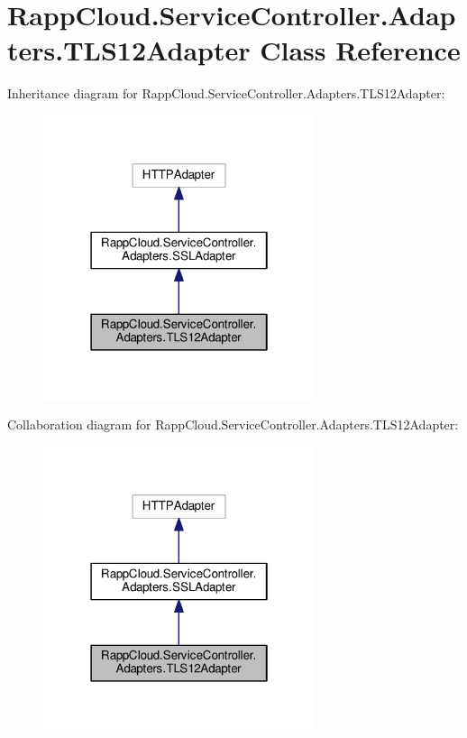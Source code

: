 \hypertarget{classRappCloud_1_1ServiceController_1_1Adapters_1_1TLS12Adapter}{\section{Rapp\-Cloud.\-Service\-Controller.\-Adapters.\-T\-L\-S12\-Adapter Class Reference}
\label{classRappCloud_1_1ServiceController_1_1Adapters_1_1TLS12Adapter}
}


Inheritance diagram for Rapp\-Cloud.\-Service\-Controller.\-Adapters.\-T\-L\-S12\-Adapter\-:
\nopagebreak
\begin{figure}[H]
\begin{center}
\leavevmode
\includegraphics[width=226pt]{classRappCloud_1_1ServiceController_1_1Adapters_1_1TLS12Adapter__inherit__graph}
\end{center}
\end{figure}


Collaboration diagram for Rapp\-Cloud.\-Service\-Controller.\-Adapters.\-T\-L\-S12\-Adapter\-:
\nopagebreak
\begin{figure}[H]
\begin{center}
\leavevmode
\includegraphics[width=226pt]{classRappCloud_1_1ServiceController_1_1Adapters_1_1TLS12Adapter__coll__graph}
\end{center}
\end{figure}
